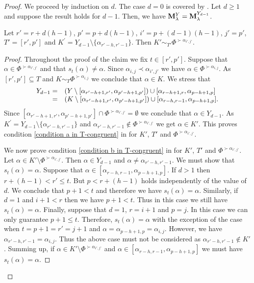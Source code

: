\begin{proof}
    We proceed by induction on $d$. The  case $d=0$ is covered by  . Let $d\geq 1$ and suppose  the result holds for $d-1$. Then,   we have  $\mathbf{M}_{\lambda}^{Y} = \mathbf{M}_{\lambda}^{Y_{d-1}}$.
\begin{claim} \label{claim prime}
Let $r'=r+d(h-1)$, $p'=p+d(h-1)$, $i'=p+(d-1)(h-1)$, $j'=p'$, $T'=[r',p']$ and $K^{\prime}= Y_{d-1}\setminus \{\alpha_{r'-h,r'-1}\}$. Then $K'\sim_{T'} \Phi^{\succ \alpha_{i',j'}}$. 
\end{claim}

\begin{proof}
Throughout the proof of the claim we fix $t\in [r',p']$. Suppose that $\alpha \in   \Phi^{\succ \alpha_{i',j'}}$ and  that $s_t(\alpha) \neq \alpha$.  Since $\alpha_{i,j} \prec \alpha_{i',j'}$ we have $\alpha \in \Phi^{\succ \alpha_{i,j}}$. As $[r',p']\subseteq T$ and $K\sim_T \Phi^{\succ\alpha_{i,j}}$ we conclude that $\alpha\in K$. We stress that 
\begin{equation}\label{eq: Y_{d-1}}
\begin{array}{rl} 
  Y_{d-1} =   & (Y\setminus [\alpha_{r'-h+1,r'},\alpha_{p'-h+1,p'}]) \cup [\alpha_{r-h+1,r},\alpha_{p-h+1,p}] \\
     = & (K\setminus [\alpha_{r'-h+1,r'},\alpha_{p'-h+1,p'}]) \cup [\alpha_{r-h,r-1},\alpha_{p-h+1,p}] .
\end{array}
\end{equation}
Since $[\alpha_{r'-h+1,r'},\alpha_{p'-h+1,p'}]\cap \Phi^{\succ \alpha_{i',j'}}  = \emptyset $ we conclude that $\alpha \in Y_{d-1}$.  As $K^{\prime}= Y_{d-1}\setminus \{\alpha_{r'-h,r'-1}\}$ and $\alpha_{r'-h,r'-1} \notin  \Phi^{\succ \alpha_{i',j'}}$ we get $\alpha \in K'$. This proves condition \ref{condition a in T-congruent} in  for $K'$, $T'$ and  $\Phi^{\succ \alpha_{i',j'}}$. 

\smallskip
We now prove condition \ref{condition b in T-congruent}  in  for $K'$, $T'$ and  $\Phi^{\succ \alpha_{i',j'}}$. Let $\alpha \in K' \setminus \Phi^{\succ \alpha_{i',j'}} $. Then $\alpha \in Y_{d-1}$ and $\alpha \neq \alpha_{r'-h,r'-1}$. We must show that $s_t(\alpha) = \alpha$.   Suppose that $\alpha \in [\alpha_{r-h,r-1},\alpha_{p-h+1,p}]$. If $d>1$ then $r+ (h-1) <r' \leq t$. But $p <r+ (h-1) $ holds independently of the value of $d$. We conclude that $p+1<t$  and therefore we have $s_t(\alpha) = \alpha$. Similarly, if  $d=1$ and $i+1<r $ then we have $p+1<t $. Thus in this case we still have $s_t(\alpha) =\alpha$. Finally, suppose that $d=1$, $r=i+1$ and $p=j$. In this case we can only guarantee $p+1\leq t$. Therefore, $s_t(\alpha) = \alpha$ with the exception of the case when $t=p+1=r'=j+1$ and $\alpha =\alpha_{p-h+1,p} =\alpha_{i,j} $. However, we have $ \alpha_{r'-h,r'-1} = \alpha_{i,j}$. Thus the above case must not be considered as $\alpha_{r'-h,r'-1} \notin K'$. Summing up, if $\alpha \in K' \setminus \Phi^{\succ \alpha_{i',j'}} $ and $\alpha \in [\alpha_{r-h,r-1},\alpha_{p-h+1,p}]$ we must have $s_t(\alpha) = \alpha$. 


\end{proof}
\end{proof}
